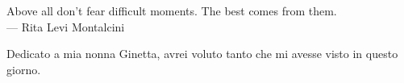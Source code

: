 
\cleardoublepage
{}
\thispagestyle{empty}

\vspace*{3cm}

\begin{center}
Above all don't fear difficult moments. The best comes from them. \\ \medskip
--- Rita Levi Montalcini
\end{center}

\medskip

\begin{center}
Dedicato a mia nonna Ginetta, avrei voluto tanto che mi avesse visto in questo giorno.
\end{center}
